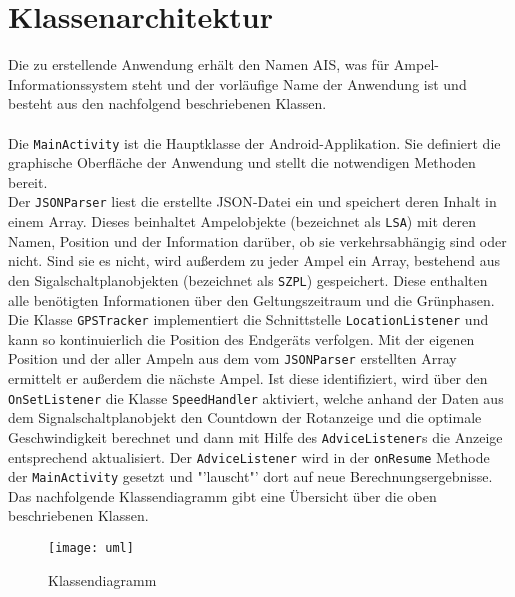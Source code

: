 \section{Klassenarchitektur}
Die zu erstellende Anwendung erhält den Namen AIS, was für Ampel-Informationssystem steht und der vorläufige Name der Anwendung ist und besteht aus den nachfolgend beschriebenen Klassen. \\\\
Die \texttt{MainActivity} ist die Hauptklasse der Android-Applikation. Sie definiert die graphische Oberfläche der Anwendung und stellt die notwendigen Methoden bereit. \\
Der \texttt{\gls{JSON}Parser} liest die erstellte \gls{JSON}-Datei ein und speichert deren Inhalt in einem Array. Dieses beinhaltet Ampelobjekte (bezeichnet als \texttt{LSA}) mit deren Namen, Position und der Information darüber, ob sie verkehrsabhängig sind oder nicht. Sind sie es nicht, wird außerdem zu jeder Ampel ein Array, bestehend aus den Sigalschaltplanobjekten (bezeichnet als \texttt{SZPL}) gespeichert. Diese enthalten alle benötigten Informationen über den Geltungszeitraum und die Grünphasen.\\ 
Die Klasse \texttt{GPSTracker} implementiert die Schnittstelle \texttt{LocationListener} und kann so kontinuierlich die Position des Endgeräts verfolgen. Mit der eigenen Position und der aller Ampeln aus dem vom \texttt{JSONParser} erstellten Array ermittelt er außerdem die nächste Ampel. Ist diese identifiziert, wird über den \texttt{OnSetListener} die Klasse \texttt{SpeedHandler} aktiviert, welche anhand der Daten aus dem Signalschaltplanobjekt den Countdown der Rotanzeige und die optimale Geschwindigkeit berechnet und dann mit Hilfe des \texttt{AdviceListener}s die Anzeige  entsprechend aktualisiert. Der \texttt{AdviceListener} wird in der \texttt{onResume} Methode der \texttt{MainActivity} gesetzt und "'lauscht"' dort auf neue Berechnungsergebnisse.\\
Das nachfolgende Klassendiagramm gibt eine Übersicht über die oben beschriebenen Klassen.\\
\begin{figure}[H]  
    \centering  
    \texttt{[image: uml]} 
    \grayRule
    \caption{Klassendiagramm}
    \label{fig:uml}
\end{figure}
